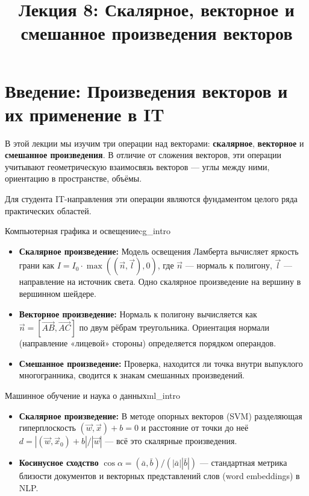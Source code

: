 \documentclass[12pt,a4paper]{article}
\title{Лекция 8: Скалярное, векторное и смешанное произведения векторов}
\author{}
\date{}
\newcommand{\va}{\bar{a}}
\newcommand{\vb}{\bar{b}}
\begin{document}
\maketitle
\thispagestyle{fancy}

\section*{Введение: Произведения векторов и их применение в IT}

В этой лекции мы изучим три операции над векторами: \textbf{скалярное},
\textbf{векторное} и \textbf{смешанное произведения}. В отличие от
сложения векторов, эти операции учитывают геометрическую взаимосвязь
векторов — углы между ними, ориентацию в пространстве, объёмы.

Для студента IT-направления эти операции являются фундаментом целого ряда
практических областей.

\begin{remarkIT}{Компьютерная графика и освещение}{cg_intro}
  \begin{itemize}
    \item \textbf{Скалярное произведение:} Модель освещения Ламберта
      вычисляет яркость грани как $I = I_0 \cdot \max((\vec{n}, \vec{l}), 0)$,
      где $\vec{n}$ — нормаль к полигону, $\vec{l}$ — направление на источник
      света. Одно скалярное произведение на вершину в вершинном шейдере.
    \item \textbf{Векторное произведение:} Нормаль к полигону вычисляется как
      $\vec{n} = [\overrightarrow{AB}, \overrightarrow{AC}]$ по двум рёбрам
      треугольника. Ориентация нормали (направление «лицевой» стороны)
      определяется порядком операндов.
    \item \textbf{Смешанное произведение:} Проверка, находится ли точка внутри
      выпуклого многогранника, сводится к знакам смешанных произведений.
  \end{itemize}
\end{remarkIT}

\begin{remarkIT}{Машинное обучение и наука о данных}{ml_intro}
  \begin{itemize}
    \item \textbf{Скалярное произведение:} В методе опорных векторов (SVM)
      разделяющая гиперплоскость $(\vec{w}, \vec{x}) + b = 0$ и расстояние
      от точки до неё $d = |(\vec{w}, \vec{x}_0) + b| / |\vec{w}|$ —
      всё это скалярные произведения.
    \item \textbf{Косинусное сходство} $\cos\alpha = (\va, \vb)/(|\va||\vb|)$
      — стандартная метрика близости документов и векторных представлений
      слов (word embeddings) в NLP.
  \end{itemize}
\end{remarkIT}
\end{document}
